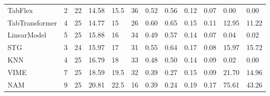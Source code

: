 \begin{tabular}{lllllrllllll}
TabFlex & 2 & 22 & 14.58 & 15.5 & 36 & 0.52 & 0.56 & 0.12 & 0.07 & 0.00 & 0.00 \\
TabTransformer & 4 & 25 & 14.77 & 15 & 26 & 0.60 & 0.65 & 0.15 & 0.11 & 12.95 & 11.22 \\
LinearModel & 5 & 25 & 15.88 & 16 & 34 & 0.49 & 0.57 & 0.14 & 0.07 & 0.04 & 0.02 \\
STG & 3 & 24 & 15.97 & 17 & 31 & 0.55 & 0.64 & 0.17 & 0.08 & 15.97 & 15.72 \\
KNN & 4 & 25 & 16.79 & 18 & 33 & 0.48 & 0.50 & 0.14 & 0.09 & 0.02 & 0.00 \\
VIME & 7 & 25 & 18.59 & 19.5 & 32 & 0.39 & 0.27 & 0.15 & 0.09 & 21.70 & 14.96 \\
NAM & 9 & 25 & 20.81 & 22.5 & 16 & 0.39 & 0.24 & 0.19 & 0.17 & 75.61 & 43.26 \\
\bottomrule
\end{tabular}
